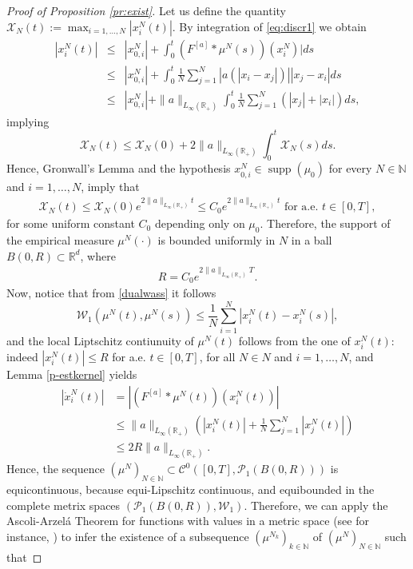 \documentclass[A4paper,11pt]{article}
\theoremstyle{definition}
\newcommand{\N}{\mathbb{N}}
\newcommand{\R}{\mathbb{R}}
\newcommand{\W}{\mathcal{W}}
\DeclareMathOperator{\supp}{supp}
\newcommand{\Fun}[1]{F^{[#1]}}
\begin{document}
\begin{proof}[Proof of Proposition \ref{pr:exist}]



Let us define the quantity $\mathcal X_N(t) := \max_{i=1,\dots,N} |x_i^N(t)|$. By integration of \eqref{eq:discr1} we obtain
\begin{eqnarray*}
 |x_i^N(t)| &\leq& |x^N_{0,i}| + \int_0^t (\Fun{a} * \mu^N(s))(x_i^N)| ds \\
&\leq&  |x^N_{0,i}| + \int_0^t\frac{1}{N} \sum_{j=1}^N |a(|x_i-x_j|)||x_j-x_i| ds \\
&\leq&  |x^N_{0,i}| + \|a\|_{L_{\infty}(\R_+)} \int_0^t\frac{1}{N} \sum_{j=1}^N( |x_j| + | x_i| )ds,
\end{eqnarray*}
implying
$$
\mathcal X_N(t) \leq \mathcal X_N(0) + 2  \|a\|_{L_{\infty}(\R_+)} \int_0^t \mathcal X_N(s) ds. 
$$
Hence, Gronwall's Lemma and the hypothesis $x^{N}_{0,i} \in \supp(\mu_0)$ for every $N \in \N$ and $i = 1, \ldots, N$, imply that
\begin{align*}
\mathcal X_N(t) \leq \mathcal X_N(0) e^{2 \|a\|_{L_{\infty}(\R_+)} t} \leq C_0 e^{2 \|a\|_{L_{\infty}(\R_+)} t} \text{ for a.e. } t \in [0,T],
\end{align*}
for some uniform constant $C_0$ depending only on $\mu_0$. Therefore, the support of the empirical measure $\mu^N(\cdot)$ is bounded uniformly in $N$ in a ball $B(0,R) \subset \R^d$, where
\begin{align}\label{Rest}
R =  C_0 e^{2 \|a\|_{L_{\infty}(\R_+)} T}.
\end{align}
Now, notice that from \eqref{dualwass} it follows
$$
\mathcal W_1(\mu^N(t), \mu^N(s)) \leq \frac{1}{N} \sum_{i=1}^N | x_i^N(t) - x_i^N(s)| ,
$$
and the local Liptschitz contiunuity of $\mu^N(t)$ follows from the one of $x_i^N(t)$: indeed  $|x^N_i(t)| \leq R$ for a.e. $t \in [0,T]$, for all $N \in N$ and $i = 1, \ldots, N$, and Lemma \ref{p-estkernel} yields
\begin{align*}
|\dot{x}^N_i(t)| &= |(\Fun{a}*\mu^N(t))(x^N_i(t))| \\
&\leq \|a\|_{L_{\infty}(\R_+)} \left( |x^N_i(t)| + \frac{1}{N}\sum^N_{j = 1}|x^N_j(t)|\right) \\
&\leq 2R\|a\|_{L_{\infty}(\R_+)}.
\end{align*}
Hence, the sequence $(\mu^N)_{N \in \N} \subset \mathcal{C}^0([0,T],\mathcal{P}_1(B(0,R)))$ is equicontinuous, because equi-Lipschitz continuous, and equibounded in the complete metrix spaces $(\mathcal{P}_1(B(0,R)),\W_1)$.
Therefore, we can apply the Ascoli-Arzel\'{a} Theorem for functions with values in a metric space (see for instance, \cite[Chapter 7, Theorem 18]{KelleyTop}) to infer the existence of a subsequence $(\mu^{N_k})_{k \in \N}$ of $(\mu^N)_{N \in \N}$ such that

\end{proof}
\end{document}
